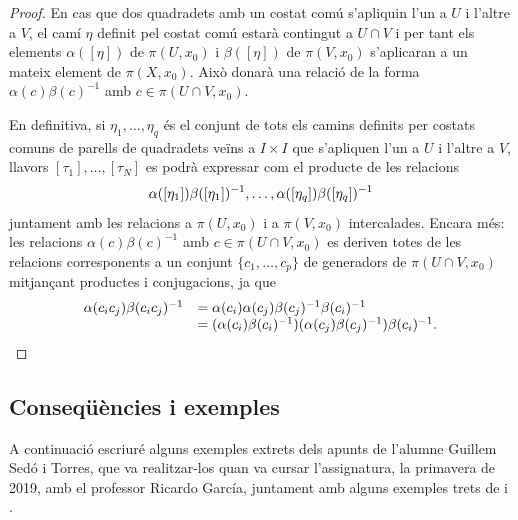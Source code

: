 \documentclass[../main.tex]{subfiles}
\begin{document}
\begin{proof}
En cas que dos quadradets amb un costat comú s'apliquin l'un a $U$ i l'altre a $V$, el camí $\eta$ definit pel costat comú estarà contingut a $U\cap V$ i per tant els elements $\alpha([\eta])$ de $\pi(U,x_0)$ i $\beta([\eta])$ de $\pi(V,x_0)$ s'aplicaran a un mateix element de $\pi(X,x_0)$. Això donarà una relació de la forma $\alpha(c)\beta(c)^{-1}$ amb $c\in \pi(U\cap V,x_0)$.

En definitiva, si $\eta_1,\ldots,\eta_q$ és el conjunt de tots els camins definits per costats comuns de parells de quadradets veïns a $I\times I$ que s'apliquen l'un a $U$ i l'altre a $V$, llavors $[\tau_1],\ldots,[\tau_N]$ es podrà expressar com el producte de les relacions
\begin{equation}
    \notag
    \alpha([\eta_1])\beta([\eta_1])^{-1},\ldots,\alpha([\eta_q])\beta([\eta_q])^{-1}
\end{equation}
juntament amb les relacions a $\pi(U,x_0)$ i a $\pi(V,x_0)$ intercalades. Encara més: les relacions $\alpha(c)\beta(c)^{-1}$ amb $c\in \pi(U\cap V,x_0)$ es deriven totes de les relacions corresponents a un conjunt $\{c_1,\ldots,c_p\}$ de generadors de $\pi(U\cap V,x_0)$ mitjançant productes i conjugacions, ja que
\begin{equation}
    \notag
    \begin{array}{rl}
        \alpha(c_ic_j)\beta(c_ic_j)^{-1} & = \alpha(c_i)\alpha(c_j)\beta(c_j)^{-1}\beta(c_i)^{-1} \\
         & = (\alpha(c_i)\beta(c_i)^{-1})(\alpha(c_j)\beta(c_j)^{-1})\beta(c_i)^{-1}.
    \end{array}
\end{equation}
\end{proof}



\subsection{Conseqüències i exemples}

A continuació escriuré alguns exemples extrets dels apunts de l'alumne Guillem Sedó i Torres, que va realitzar-los quan va cursar l'assignatura, la primavera de 2019, amb el professor Ricardo García, juntament amb alguns exemples trets de \cite{youtubejonathanevans} i \cite{youtubematneth}. 
\end{document}

